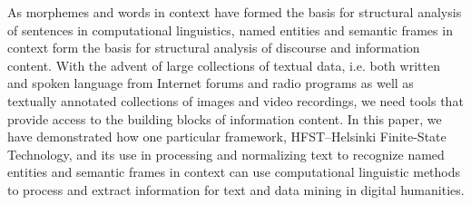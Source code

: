 \documentclass{llncs}
\begin{document}
As morphemes and words in context have formed the basis for structural analysis
of sentences in computational linguistics, named entities and semantic frames in context 
form the basis for structural analysis of discourse and information content. 
With the advent of large collections of textual data, i.e. both written and spoken language from
Internet forums and radio programs as well as textually annotated
collections of images and video recordings, we need tools that provide access to
the building blocks of information content. In this paper, we have demonstrated how one
particular framework, HFST--Helsinki Finite-State Technology, and its
use in processing and normalizing text to recognize named entities and semantic frames in context can
use computational linguistic methods to process and extract information 
for text and data mining in digital humanities.



\end{document}

